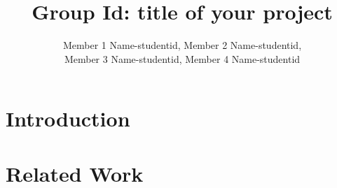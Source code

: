\documentclass[10pt,journal,compsoc]{IEEEtran}
\begin{document}
\title{Group Id: title of your project}


\author{Member 1 Name-studentid,
        Member 2 Name-studentid,\\
        Member 3 Name-studentid,
        Member 4 Name-studentid

}




\IEEEtitleabstractindextext{%


}


\maketitle


\IEEEdisplaynontitleabstractindextext



%
\IEEEpeerreviewmaketitle



\section{Introduction}\label{sec:introduction}


\section{Related Work}\label{sec:related}

\end{document}

